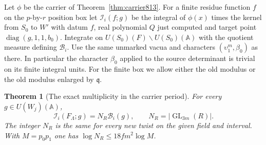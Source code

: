 \documentclass[a4paper,11pt]{article}
\newtheorem{theorem}[proposition]{Theorem}
\theoremstyle{definition}
\theoremstyle{remark}
\numberwithin{equation}{section}
\begin{document}
Let \(\phi\) be the carrier of Theorem~\ref{thm:carrier813}.
For a finite residue function \(f\) on the \(p\)-by-\(r\)
position box let \(\mathcal I_i(f;g)\) be the integral of
\(\phi(x)\) times the kernel from \(S_0\) to \(W'\) with
datum \(f\), real polynomial \(Q\) just computed and target
point \(\operatorname{diag}(g,1,1,b_0)\). Integrate on
\(U(S_0)(F)\backslash U(S_0)(\mathbb A)\) with the quotient
measure defining \(\mathcal B_i\). Use the same unmarked
vacua and characters \((\upsilon_1^m,\beta_0)\) as there.
In particular the character \(\beta_0\) applied to the
source determinant is trivial on its finite integral units.
For the finite box we allow either the old modulus or the
old modulus enlarged by \(\mathfrak q\).

\begin{theorem}[The exact multiplicity in the carrier period]
\leavevmode\label{thm:carriermultiplicity825}
For every \(g\in U(W_j)(\mathbb A)\),
\[
   \mathcal I_i(F_\Lambda;g)=N_R\mathcal B_i(g),
   \qquad N_R=|\operatorname{GL}_{3m}(R)|.
\]
The integer \(N_R\) is the same for every new twist on the
given field and interval. With \(M=p_0p_1\) one has
\(\log N_R\le18fm^2\log M\).
\end{theorem}
\end{document}
